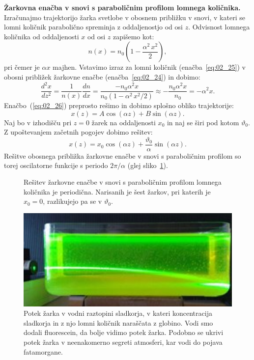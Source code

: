 \begin{example}
{\bf Žarkovna enačba v snovi s paraboličnim profilom
lomnega količnika.} Izračunajmo trajektorijo žarka svetlobe v 
obosnem približku v snovi, v kateri se lomni količnik parabolično 
spreminja z oddaljenostjo od osi $z$.  Odvisnost lomnega količnika 
od oddaljenosti $x$ od osi $z$ zapišemo kot:
\begin{equation}
 n(x) = n_0 \left(1-\frac{\alpha^2\,x^2}{2}\right)\!,
 \label{eq:02_25}
\end{equation}
pri čemer je $\alpha x$ majhen.
Vstavimo izraz za lomni količnik (enačba~\ref{eq:02_25}) v obosni približek
žarkovne enačbe (enačba~\ref{eq:02_24}) in dobimo:
\begin{equation}
 \frac{d^2x}{dz^2}= \frac{1}{n(x)}\frac{dn}{dx} = 
 \frac{-n_0 \alpha^2x}{n_0 \left(1-\alpha^2\,x^2/2\right)} 
 \approx -\frac{n_0\alpha^2x}{n_0} = -\alpha^2x.
 \label{eq:02_26}
\end{equation}
Enačbo~(\ref{eq:02_26}) preprosto rešimo in dobimo splošno 
obliko trajektorije:
\begin{equation}
 x(z) = A \cos (\alpha z) + B \sin (\alpha z).
  \label{eq:02_27}
\end{equation}
Naj bo v izhodišču pri $z=0$ žarek na oddaljenosti $x_0$ 
in naj se širi pod kotom $\vartheta_0$. 
Z upoštevanjem začetnih pogojev dobimo rešitev:
\begin{equation}
x (z) = x_0 \cos(\alpha z) + \frac{\vartheta_0}{\alpha} \sin (\alpha z).
 \label{eq:02_28}
\end{equation}
Rešitve obosnega približka žarkovne enačbe v snovi s paraboličnim profilom 
so torej oscilatorne funkcije s periodo $2\pi/\alpha$ (glej sliko~\ref{fig:02_FerPar}).
\begin{figure}[ht]
\centering
\def\svgwidth{100truemm} 

\caption{Rešitev žarkovne enačbe v snovi s paraboličnim profilom lomnega
količnika je periodična. Narisanih
je šest žarkov, pri katerih je $x_0=0$, razlikujejo pa se v $\vartheta_0$.}
\label{fig:02_FerPar}
\end{figure}

\begin{figure}[ht]
\centering
\includegraphics[width=10truecm]{slike/02_Sladkor.jpg}
\caption{Potek žarka v vodni raztopini sladkorja, v kateri koncentracija sladkorja in z
njo lomni količnik naraščata z globino. Vodi smo dodali fluorescein, da bolje vidimo potek žarka. Podobno se ukrivi potek žarka v neenakomerno segreti atmosferi, kar vodi
do pojava fatamorgane.}
\label{fig:02_Sladkor}
\end{figure}
\end{example}

